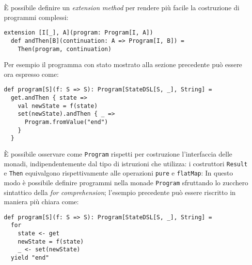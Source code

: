 È possibile definire un \emph{extension method} per rendere più facile la costruzione di programmi complessi:
\begin{lstlisting}[language=scala3]
extension [I[_], A](program: Program[I, A])
  def andThen[B](continuation: A => Program[I, B]) =
    Then(program, continuation)
\end{lstlisting}

Per esempio il programma con stato mostrato alla sezione precedente può essere ora espresso come:
\begin{lstlisting}[language=scala3]
def program[S](f: S => S): Program[StateDSL[S, _], String] =
  get.andThen { state => 
    val newState = f(state)
    set(newState).andThen { _ => 
      Program.fromValue("end")
    }
  }
\end{lstlisting}

È possibile osservare come \lstinline{Program} rispetti per costruzione l'interfaccia delle monadi, indipendentemente dal tipo di istruzioni che utilizza: i costruttori \lstinline{Result} e \lstinline{Then} equivalgono rispettivamente alle operazioni \lstinline{pure} e \lstinline{flatMap}:
In questo modo è possibile definire programmi nella monade \lstinline{Program} sfruttando lo zucchero sintattico della \emph{for comprehension}; l'esempio precedente può essere riscritto in maniera più chiara come:
\begin{lstlisting}[language=scala3]
def program[S](f: S => S): Program[StateDSL[S, _], String] =
  for
    state <- get
    newState = f(state)
    _ <- set(newState)
  yield "end"
\end{lstlisting}
